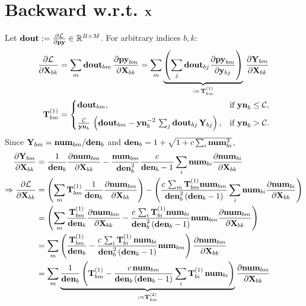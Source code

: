 \documentclass{article}
\begin{document}

\section{Backward w.r.t. $\v{X}$}

Let $\v{dout}:=\ddfrac{\mathcal{L}}{\v{py}}\in\mathbb{R}^{B\times M}$. For arbitrary indices $b,k$:
\begin{align}
\ddfrac{\mathcal{L}}{\v{X}{bk}}
&= \sum_m \v{dout}{bm}\,\ddfrac{\v{py}{bm}}{\v{X}{bk}}
= \sum_m \underbrace{\left( \sum_j \v{dout}{bj} \ddfrac{\v{py}{bm}}{\v{y}{bj}} \right)}_{:=\,\T{1}{bm}} \,\ddfrac{\v{Y}{bm}}{\v{X}{bk}} \\
\T{1}{bm} &=
\begin{cases}
  \v{dout}{bm}, & \text{if } \v{yn}_b \le \mathcal{C}, \\[6pt]
  \frac{\mathcal{C}}{\v{yn}{b}}\,\left(\v{dout}{bm} - \v{yn}{b}^{-2}\,\sum_j \v{dout}{bj}\,\v{Y}{bj}\right),
    & \text{if } \v{yn}_b > \mathcal{C}.
\end{cases} \\
\end{align}
Since $\v{Y}{bm}=\v{num}{bm}/\v{den}{b}$ and $\v{den}{b} = 1+\sqrt{1+c\sum_i \v{num}{bi}^2}$,
\begin{align}
\ddfrac{\v{Y}{bm}}{\v{X}{bk}}
&= \frac{1}{\v{den}{b}}\ddfrac{\v{num}{bm}}{\v{X}{bk}} - \frac{\v{num}{bm}}{\v{den}{b}^2}\frac{c}{\v{den}{b}-1}\sum_i \v{num}{bi}\ddfrac{\v{num}{bi}}{\v{X}{bk}} \\
\Rightarrow \ddfrac{\mathcal{L}}{\v{X}{bk}} &= \left( \sum_m \T{1}{bm}\,\frac{1}{\v{den}{b}}\ddfrac{\v{num}{bm}}{\v{X}{bk}} \right) - \left( \frac{c\,\sum_m \T{1}{bm} \v{num}{bm}}{\v{den}{b}^2\,(\v{den}{b}-1)}\sum_i \v{num}{bi}\ddfrac{\v{num}{bi}}{\v{X}{bk}} \right) \\
&= \left( \sum_m \frac{\T{1}{bm}}{\v{den}{b}}\ddfrac{\v{num}{bm}}{\v{X}{bk}} - \frac{c\,\sum_i \T{1}{bi} \v{num}{bi}}{\v{den}{b}^2\,(\v{den}{b}-1)} \v{num}{bm}\ddfrac{\v{num}{bm}}{\v{X}{bk}} \right) \\
&= \sum_m \left( \frac{\T{1}{bm}}{\v{den}{b}} - \frac{c\,\sum_i \T{1}{bi}\, \v{num}{bi}}{\v{den}{b}^2\,(\v{den}{b}-1)} \v{num}{bm} \right) \ddfrac{\v{num}{bm}}{\v{X}{bk}}  \\
&= \sum_m \underbrace{\frac{1}{\v{den}{b}} \left(\T{1}{bm} - \frac{c\,\v{num}{bm}}{\v{den}{b}\,(\v{den}{b}-1)} \sum_i \T{1}{bi}\, \v{num}{bi}  \right)}_{:=\T{2}{bm}} \ddfrac{\v{num}{bm}}{\v{X}{bk}}  \\
\end{align}
\end{document}
